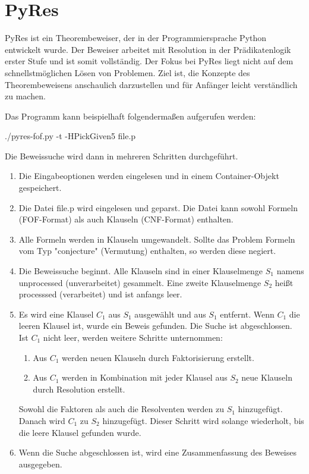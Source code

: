 	\section{PyRes}
PyRes ist ein Theorembeweiser, der in der Programmiersprache Python entwickelt wurde. Der Beweiser arbeitet mit Resolution in der Prädikatenlogik erster Stufe und ist somit vollständig. Der Fokus bei PyRes liegt nicht auf dem schnellstmöglichen Lösen von Problemen. Ziel ist, die Konzepte des Theorembeweisens anschaulich darzustellen und für Anfänger leicht verständlich zu machen. \cite{Schulz2020PyRes}

Das Programm kann beispielhaft folgendermaßen aufgerufen werden:

./pyres-fof.py -t -HPickGiven5 file.p

Die Beweissuche wird dann in mehreren Schritten durchgeführt. 
\begin{enumerate}
	\item Die Eingabeoptionen werden eingelesen und in einem Container-Objekt gespeichert.
	\item Die Datei file.p wird eingelesen und geparst. Die Datei kann sowohl Formeln (FOF-Format) als auch Klauseln (CNF-Format) enthalten.
	\item Alle Formeln werden in Klauseln umgewandelt. Sollte das Problem Formeln vom Typ "conjecture" (Vermutung) enthalten, so werden diese negiert.
	\item Die Beweissuche beginnt. Alle Klauseln sind in einer Klauselmenge $S_1$ namens unprocessed (unverarbeitet) gesammelt. Eine zweite Klauselmenge $S_2$ heißt processsed (verarbeitet) und ist anfangs leer. 
	\item Es wird eine Klausel $C_1$ aus $S_1$ ausgewählt und aus $S_1$ entfernt. Wenn $C_1$ die leeren Klausel ist, wurde ein Beweis gefunden. Die Suche ist abgeschlossen. Ist $C_1$ nicht leer, werden weitere Schritte unternommen:
	\begin{enumerate}
		\item Aus $C_1$ werden neuen Klauseln durch Faktorisierung erstellt.
		\item Aus $C_1$ werden in Kombination mit jeder Klausel aus $S_2$ neue Klauseln durch Resolution erstellt.
	\end{enumerate}
	Sowohl die Faktoren als auch die Resolventen werden zu $S_1$ hinzugefügt. Danach wird $C_1$ zu $S_2$ hinzugefügt. Dieser Schritt wird solange wiederholt, bis die leere Klausel gefunden wurde.
	\item Wenn die Suche abgeschlossen ist, wird eine Zusammenfassung des Beweises ausgegeben.
\end{enumerate}

